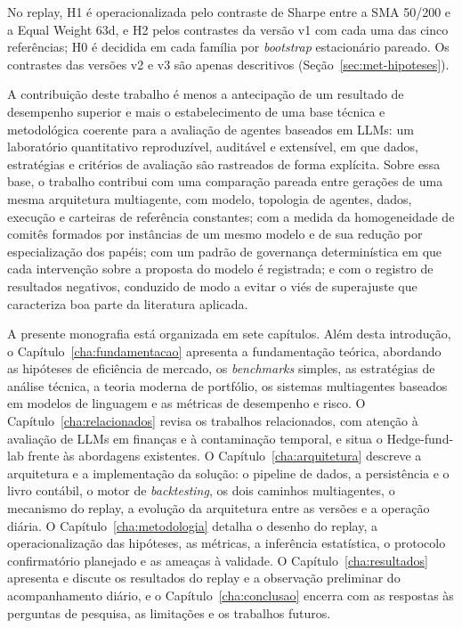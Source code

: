 \documentclass{eic-bcc-tcc}
\begin{document}
No replay, H1 é operacionalizada pelo contraste de Sharpe entre a SMA 50/200 e a Equal Weight 63d, e H2 pelos contrastes da versão v1 com cada uma das cinco referências; H0 é decidida em cada família por \textit{bootstrap} estacionário pareado. Os contrastes das versões v2 e v3 são apenas descritivos (Seção~\ref{sec:met-hipoteses}).

A contribuição deste trabalho é menos a antecipação de um resultado de desempenho superior e mais o estabelecimento de uma base técnica e metodológica coerente para a avaliação de agentes baseados em LLMs: um laboratório quantitativo reproduzível, auditável e extensível, em que dados, estratégias e critérios de avaliação são rastreados de forma explícita. Sobre essa base, o trabalho contribui com uma comparação pareada entre gerações de uma mesma arquitetura multiagente, com modelo, topologia de agentes, dados, execução e carteiras de referência constantes; com a medida da homogeneidade de comitês formados por instâncias de um mesmo modelo e de sua redução por especialização dos papéis; com um padrão de governança determinística em que cada intervenção sobre a proposta do modelo é registrada; e com o registro de resultados negativos, conduzido de modo a evitar o viés de superajuste que caracteriza boa parte da literatura aplicada.

A presente monografia está organizada em sete capítulos. Além desta introdução, o Capítulo~\ref{cha:fundamentacao} apresenta a fundamentação teórica, abordando as hipóteses de eficiência de mercado, os \textit{benchmarks} simples, as estratégias de análise técnica, a teoria moderna de portfólio, os sistemas multiagentes baseados em modelos de linguagem e as métricas de desempenho e risco. O Capítulo~\ref{cha:relacionados} revisa os trabalhos relacionados, com atenção à avaliação de LLMs em finanças e à contaminação temporal, e situa o Hedge-fund-lab frente às abordagens existentes. O Capítulo~\ref{cha:arquitetura} descreve a arquitetura e a implementação da solução: o pipeline de dados, a persistência e o livro contábil, o motor de \textit{backtesting}, os dois caminhos multiagentes, o mecanismo do replay, a evolução da arquitetura entre as versões e a operação diária. O Capítulo~\ref{cha:metodologia} detalha o desenho do replay, a operacionalização das hipóteses, as métricas, a inferência estatística, o protocolo confirmatório planejado e as ameaças à validade. O Capítulo~\ref{cha:resultados} apresenta e discute os resultados do replay e a observação preliminar do acompanhamento diário, e o Capítulo~\ref{cha:conclusao} encerra com as respostas às perguntas de pesquisa, as limitações e os trabalhos futuros.
\end{document}
